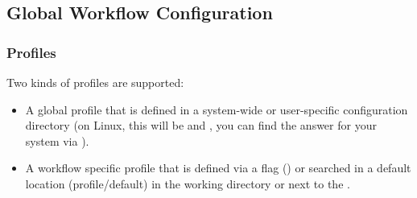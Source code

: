 \subsection{Global Workflow Configuration}

\begin{frame}[fragile]
  \frametitle{\Snakemake{} Profiles}
  Two kinds of profiles are supported:
  \begin{itemize}[<+->]
  	\item A global profile that is defined in a system-wide or user-specific configuration directory (on Linux, this will be  and , you can find the answer for your system via ).
  	\item A workflow specific profile that is defined via a flag () or searched in a default location (profile/default) in the working directory or next to the .
  \end{itemize}
\end{frame}

